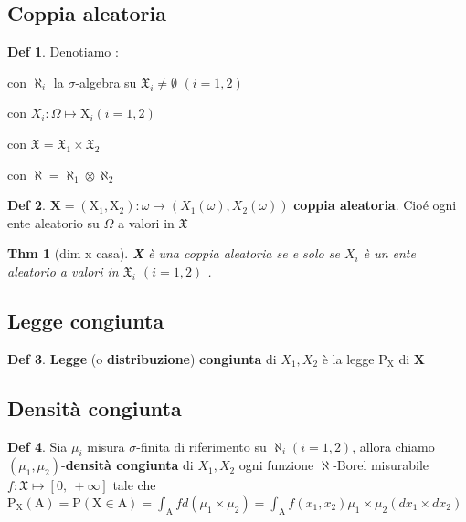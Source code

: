 \documentclass[a4paper,11pt]{article}
\theoremstyle{plain}
\newtheorem{thm}{Thm}[section]
\theoremstyle{definition}
\newtheorem{defn}{Def}[section]
\theoremstyle{remark}
\begin{document}
\subsection{Coppia aleatoria}
\begin{defn} Denotiamo :

    con $\aleph_{i}$ la $\sigma$-algebra su $\mathfrak{X}_{i}\neq\emptyset$ $(i=1,2)$

  con $X_{i}:\Omega\mapsto \mathrm{X}_{i}(i=1,2)$

  con $\mathfrak{X}=\mathfrak{X}_{1}\times \mathfrak{X}_{2}$ 
 
 con $\aleph=\aleph_{1}\otimes\aleph_{2}$
\end{defn}

\begin{defn}
 $\textbf{X}=(\mathrm{X}_{1}, \mathrm{X}_{2}):\omega\mapsto(X_{1}(\omega), X_{2}(\omega))$   \textbf{coppia aleatoria}. Cioé ogni ente aleatorio su $\Omega$ a valori in $\mathfrak{X}$
\end{defn}


\begin{thm}[dim x casa] \textbf{X} \`{e} una coppia aleatoria se e solo se $X_{i}$ \`{e} un ente aleatorio a valori in $\mathfrak{X}_{i}$  $(i=1,2)$ .
\end{thm}

\subsection{Legge congiunta}
\begin{defn}
\textbf{Legge} (o \textbf{distribuzione}) \textbf{congiunta} di $X_{1}, X_{2}$ \`{e} la legge $\mathrm{P}_{\mathrm{X}}$ di \textbf{X}
\end{defn}

\subsection{Densità congiunta}
\begin{defn}
Sia $\mu_{i}$ misura $\sigma$-finita di riferimento su $\aleph_{i}(i=1,2)$, allora chiamo
$(\mu_{1}, \mu_{2})$-\textbf{densità congiunta}  di $X_{1}, X_{2}$ ogni funzione $\aleph$-Borel misurabile $f:\mathfrak{X}\mapsto[0,\ +\infty]$ tale che \\
$\displaystyle \mathrm{P}_{\mathrm{X}}(\mathrm{A})=\mathrm{P}(\mathrm{X}\in \mathrm{A})=\int_{\mathrm{A}}fd(\mu_{1}\times\mu_{2})=\int_{\mathrm{A}}f(x_{1}, x_{2})\mu_{1}\times\mu_{2}(dx_{1}\times dx_{2})$
\end{defn}
\end{document}
